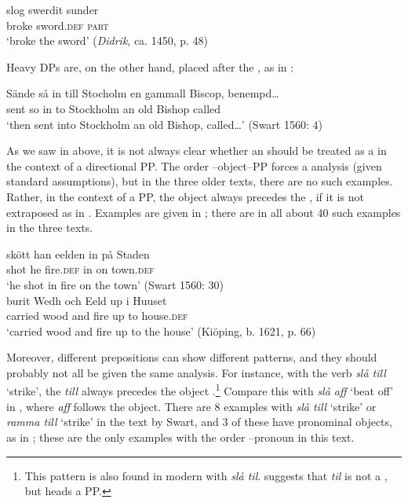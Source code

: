 \documentclass[output=paper]{langscibook}
\begin{document}
\ex
\gll  slog     swerdit     sunder \\
    broke   sword\textsc{.def}   \textsc{part}\\
\glt `broke the sword’ (\textit{Didrik}, ca. 1450, p. 48)\\
\z
\z


Heavy DPs are, on the other hand, placed after the , as in :


\ea\label{ex:lalu:24}
\gll  Sände   så  in   till   Stocholm     en   gammall   Biscop,   benempd…\\
sent       so    in   to     Stockholm     an   old       Bishop   called\\
\glt `then sent into Stockholm an old Bishop, called…’ (Swart 1560: 4)\\
\z


As we saw in  above, it is not always clear whether an  should be treated as a  in the context of a directional PP. The order –object–PP forces a  analysis (given standard assumptions), but in the three older  texts, there are no such examples. Rather, in the context of a PP, the object always precedes the , if it is not extraposed as in . Examples are given in ; there are in all about 40 such examples in the three texts.


\ea\label{ex:lalu:25}
\ea\label{ex:lalu:25a}
\gll  skött  han   eelden     in     på   Staden\\
    shot     he   fire\textsc{.def}     in   on   town\textsc{.def} \\
\glt `he shot in fire on the town’ (Swart 1560: 30)\\

\ex\label{ex:lalu:25b}
\gll  burit     Wedh   och   Eeld   up   i   Huuset \\
    carried   wood   and   fire   up   to   house\textsc{.def}\\
\glt `carried wood and fire up to the house’ (Kiöping, b. 1621, p. 66)\\
\z
\z


Moreover, different prepositions can show different patterns, and they should probably not all be given the same analysis. For instance, with the  verb \textit{slå till} ‘strike’, the  \textit{till} always precedes the object .\footnote{This pattern is also found in modern  with \textit{slå til}. \citet{Tungseth2006} suggests that \textit{til} is not a , but heads a PP.} Compare this with \textit{slå aff} ‘beat off’ in , where \textit{aff} follows the object. There are 8 examples with \textit{slå till} ‘strike’ or \textit{ramma till} ‘strike’ in the text by Swart, and 3 of these have pronominal objects, as in ; these are the only examples with the order –pronoun in this text.
\end{document}
